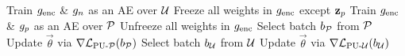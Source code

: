 \begin{algorithmic}[1]
    \State Train $g_{\text{enc}}$ \& $g_{n}$ as an AE over $\mathcal{U}$ 
    \State Freeze all weights in $g_{\text{enc}}$ except $\mathbf{z}_{p}$
    \State Train $g_{\text{enc}}$ \& $g_{p}$ as an AE over $\mathcal{P}$ 
    \State Unfreeze all weights in $g_{\text{enc}}$
    \Statex
      
        \State Select batch $b_{\mathcal{P}}$ from $\mathcal{P}$
        \State Update $\vec{\theta}$ via $\nabla\mathcal{L}_{\text{PU-}\mathcal{P}}(b_{\mathcal{P}})$
        \State Select batch $b_{\mathcal{U}}$ from $\mathcal{U}$
        \State Update $\vec{\theta}$ via $\nabla\mathcal{L}_{\text{PU-}\mathcal{U}}(b_{\mathcal{U}})$
      \EndWhile
    \EndWhile
  \EndFunction
\end{algorithmic}
